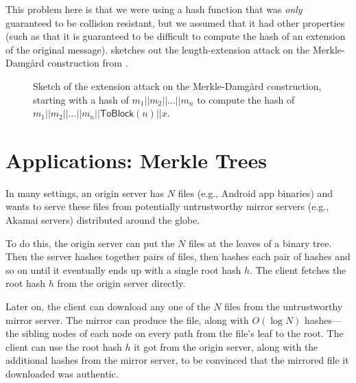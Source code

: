 This problem here is that we were using a hash
function that was \emph{only} guaranteed to be
collision resistant, but we assumed that it had other
properties (such as that it is guaranteed to be
difficult to compute the hash of an extension of
the original message).  
sketches out the length-extension attack on the Merkle-Damg\aa{}rd
construction from .

\begin{figure}[htpb]
  \centering
  \caption{Sketch of the extension attack on the Merkle-Damg\aa{}rd
    construction, starting with a hash of $m_1 || m_2 || \ldots || m_n$
    to compute the hash of $m_1 || m_2 || \ldots || m_n || \textsf{ToBlock}(n) || x$.}
  \label{fig:merkle-damgard-extension}
\end{figure}


\section{Applications: Merkle Trees}
In many settings, an origin server has $N$ files (e.g., Android app binaries)
and wants to serve these files from potentially untrustworthy mirror servers
(e.g., Akamai servers) distributed around the globe.

To do this, the origin server can put the $N$ files at the leaves of a
binary tree.
Then the server hashes together pairs of files, then hashes each pair of
hashes and so on until it eventually ends up with
a single root hash $h$.
The client fetches the root hash $h$ from the origin
server directly.

Later on, the client can download any one of the $N$
files from the untrustworthy mirror server.
The mirror can produce the file, along
with $O(\log N)$ hashes---the sibling
nodes of each node on every path from the file's
leaf to the root.
The client can use the root hash $h$ it got from
the origin server, along with the additional hashes
from the mirror server, to be convinced that the mirrored
file it downloaded was authentic.



